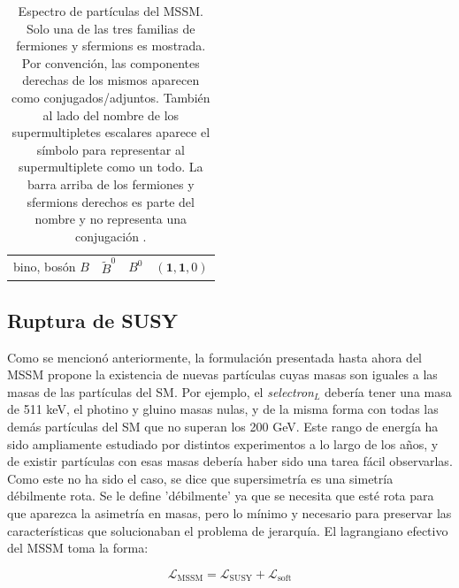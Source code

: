\begin{table}
\begin{tabular}{ l c | c c c}
		\hline

		\multicolumn{2}{l|}{bino, bosón $B$} & $\widetilde{B}^0$ & $B^0$ & $(\textbf{1}, \textbf{1}, 0)$ \\

	\end{tabular}

	\caption{Espectro de partículas del MSSM. Solo una de las tres familias de fermiones y sfermions es mostrada. Por convención, las componentes derechas de los mismos aparecen como conjugados/adjuntos. También al lado del nombre de los supermultipletes escalares aparece el símbolo para representar al supermultiplete como un todo. La barra arriba de los fermiones y sfermions derechos es parte del nombre y no representa una conjugación .}
	\label{tab:mssm_particles}

\end{table}


\subsection{Ruptura de SUSY}

Como se mencionó anteriormente, la formulación presentada hasta ahora del MSSM propone la existencia de nuevas partículas cuyas masas son iguales a las masas de las partículas del SM. Por ejemplo, el \textit{selectron}$_L$ debería tener una masa de 511 keV, el photino y gluino masas nulas, y de la misma forma con todas las demás partículas del SM que no superan los 200 GeV. Este rango de energía ha sido ampliamente estudiado por distintos experimentos a lo largo de los años, y de existir partículas con esas masas debería haber sido una tarea fácil observarlas. Como este no ha sido el caso, se dice que supersimetría es una simetría débilmente rota. Se le define 'débilmente' ya que se necesita que esté rota para que aparezca la asimetría en masas, pero lo mínimo y necesario para preservar las características que solucionaban el problema de jerarquía. El lagrangiano efectivo del MSSM toma la forma:

\begin{equation}
	\mathcal{L}_{\text{MSSM}} = \mathcal{L}_{\text{SUSY}} + \mathcal{L}_{\text{soft}} 
	\label{eq:l_susy}
\end{equation}

